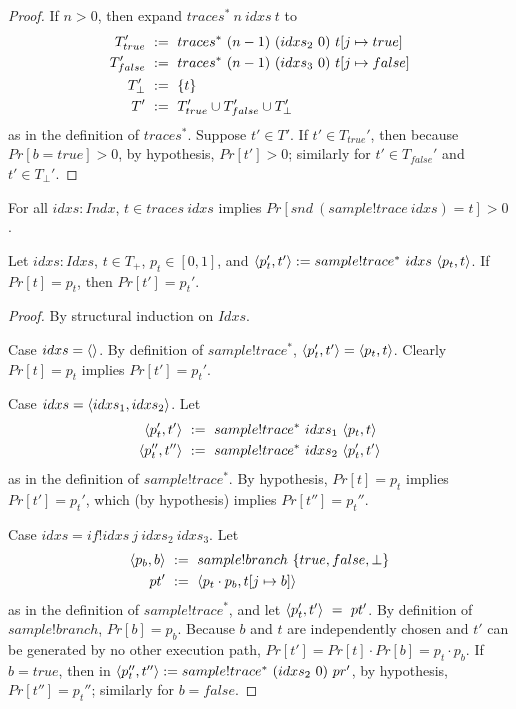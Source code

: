 \begin{proof}
If $n > 0$, then expand $traces^*~n~idxs~t$ to
\begin{equation}
\begin{aligned}
	T_{true}'&\ :=\ traces^*~(n-1)~(idxs_2~0)~t[j \mapsto true]
\\
	T_{false}'&\ :=\ traces^*~(n-1)~(idxs_3~0)~t[j \mapsto false]
\\
	T_\bot'&\ :=\ \{{t}\}
\\
	T'&\ :=\ T_{true}' \cup T_{false}' \cup T_\bot'
\end{aligned}
\end{equation}
as in the definition of $traces^*$.
Suppose $t' \in T'$.
If $t' \in T_{true}'$, then because $Pr[b = true] > 0$, by hypothesis, $Pr[t'] > 0$; similarly for $t' \in T_{false}'$ and $t' \in T_\bot'$.
\end{proof}

\begin{corollary}
For all $idxs : Indx$, $t \in traces~idxs$ implies $Pr[snd~(sample!trace~idxs) = t] > 0$.
\end{corollary}

\begin{theorem}
Let $idxs : Idxs$, $t \in T_+$, $p_t \in [0,1]$, and $\langle{p_t',t'}\rangle := sample!trace^*~idxs~\langle{p_t,t}\rangle$.
If $Pr[t] = p_t$, then $Pr[t'] = p_t'$.
\end{theorem}
\begin{proof}
By structural induction on $Idxs$.

Case $idxs = \langle{}\rangle$.
By definition of $sample!trace^*$, $\langle{p_t',t'}\rangle = \langle{p_t,t}\rangle$.
Clearly $Pr[t] = p_t$ implies $Pr[t'] = p_t'$.

Case $idxs = \langle{idxs_1,idxs_2}\rangle$.
Let
\begin{equation}
\begin{aligned}
	\langle{p_t',t'}\rangle&\ :=\ sample!trace^*~idxs_1~\langle{p_t,t}\rangle \\
	\langle{p_t'',t''}\rangle&\ :=\ sample!trace^*~idxs_2~\langle{p_t',t'}\rangle
\end{aligned}
\end{equation}
as in the definition of $sample!trace^*$.
By hypothesis, $Pr[t] = p_t$ implies $Pr[t'] = p_t'$, which (by hypothesis) implies $Pr[t''] = p_t''$.

Case $idxs = if!idxs~j~idxs_2~idxs_3$.
Let
\begin{equation}
\begin{aligned}
	\langle{p_b,b}\rangle&\ :=\ sample!branch~\{{true,false,\bot}\} \\
	pt' &\ :=\ \langle{p_t \cdot p_b, t[j \mapsto b]}\rangle
\end{aligned}
\end{equation}
as in the definition of $sample!trace^*$, and let $\langle{p_t',t'}\rangle\ =\ pt'$.
By definition of $sample!branch$, $Pr[b] = p_b$.
Because $b$ and $t$ are independently chosen and $t'$ can be generated by no other execution path, $Pr[t'] = Pr[t] \cdot Pr[b] = p_t \cdot p_b$.
If $b = true$, then in $\langle{p_t'',t''}\rangle := sample!trace^*~(idxs_2~0)~pr'$, by hypothesis, $Pr[t''] = p_t''$; similarly for $b = false$.
\end{proof}

